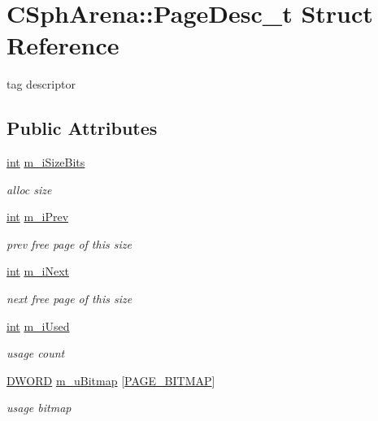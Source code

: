 \hypertarget{structCSphArena_1_1PageDesc__t}{\section{C\-Sph\-Arena\-:\-:Page\-Desc\-\_\-t Struct Reference}
\label{structCSphArena_1_1PageDesc__t}
}


tag descriptor  


\subsection*{Public Attributes}
\begin{DoxyCompactItemize}
\item 
\hyperlink{sphinxexpr_8cpp_a4a26e8f9cb8b736e0c4cbf4d16de985e}{int} \hyperlink{structCSphArena_1_1PageDesc__t_a07be4ba4a01a265014f0dcd9c60ef83b}{m\-\_\-i\-Size\-Bits}
\begin{DoxyCompactList}\small\item\em alloc size \end{DoxyCompactList}\item 
\hyperlink{sphinxexpr_8cpp_a4a26e8f9cb8b736e0c4cbf4d16de985e}{int} \hyperlink{structCSphArena_1_1PageDesc__t_af802be36b99169f785e5b2aad24f0a48}{m\-\_\-i\-Prev}
\begin{DoxyCompactList}\small\item\em prev free page of this size \end{DoxyCompactList}\item 
\hyperlink{sphinxexpr_8cpp_a4a26e8f9cb8b736e0c4cbf4d16de985e}{int} \hyperlink{structCSphArena_1_1PageDesc__t_a8fda40b33983c4f353c132699fa1d760}{m\-\_\-i\-Next}
\begin{DoxyCompactList}\small\item\em next free page of this size \end{DoxyCompactList}\item 
\hyperlink{sphinxexpr_8cpp_a4a26e8f9cb8b736e0c4cbf4d16de985e}{int} \hyperlink{structCSphArena_1_1PageDesc__t_a98788ffeb0561573976d2c3cd81b5273}{m\-\_\-i\-Used}
\begin{DoxyCompactList}\small\item\em usage count \end{DoxyCompactList}\item 
\hyperlink{sphinxstd_8h_a798af1e30bc65f319c1a246cecf59e39}{D\-W\-O\-R\-D} \hyperlink{structCSphArena_1_1PageDesc__t_a4fbc9e63a872d985884e421ca501719d}{m\-\_\-u\-Bitmap} \mbox{[}\hyperlink{classCSphArena_a128a5767da8610eae80c17ef00566942}{P\-A\-G\-E\-\_\-\-B\-I\-T\-M\-A\-P}\mbox{]}
\begin{DoxyCompactList}\small\item\em usage bitmap \end{DoxyCompactList}\end{DoxyCompactItemize}


